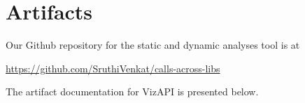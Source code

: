 \chapter{Artifacts}
\label{AppendixA}
Our Github repository for the static and dynamic analyses tool is at 

\href{https://github.com/SruthiVenkat/calls-across-libs}{https://github.com/SruthiVenkat/calls-across-libs}

\noindent
The artifact documentation for VizAPI is presented below.

